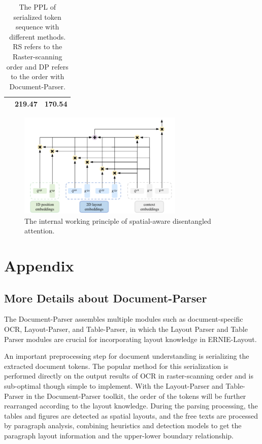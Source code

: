 \documentclass[11pt]{article}
\begin{document}
\begin{table}
\begin{tabular}{ c  c  c }
\begin{minipage}[b]{0.47\columnwidth}
    \end{minipage}
    & 219.47
    & 170.54
    \\ \bottomrule
\end{tabular}
\caption{The PPL of serialized token sequence with different methods. RS refers to the Raster-scanning order and DP refers to the order with Document-Parser.}
\label{tab:document_parser}
\end{table}

\begin{figure}
    \centering
    \includegraphics[width=0.7\textwidth]{figures/disentangle.pdf}
    \caption{The internal working principle of spatial-aware disentangled attention.}
    \label{fig:disentange}
\end{figure}

\section{Appendix}
\subsection{More Details about Document-Parser}
\label{sec:document_parser}

The Document-Parser assembles multiple modules such as document-specific OCR, Layout-Parser, and Table-Parser, in which the Layout Parser and Table Parser modules are crucial for incorporating layout knowledge in ERNIE-Layout.

An important preprocessing step for document understanding is serializing the extracted document tokens. The popular method for this serialization is performed directly on the output results of OCR in raster-scanning order and is sub-optimal though simple to implement. 
With the Layout-Parser and Table-Parser in the Document-Parser toolkit, the order of the tokens will be further rearranged according to the layout knowledge. During the parsing processing, the tables and figures are detected as spatial layouts, and the free texts are processed by paragraph analysis, combining heuristics and detection models to get the paragraph layout information and the upper-lower boundary relationship. 
\end{document}
